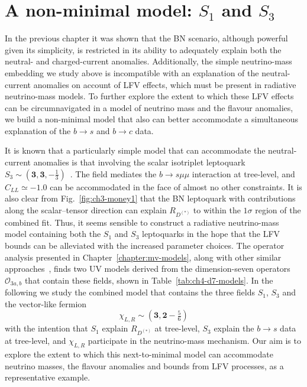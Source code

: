 \section{A non-minimal model: $S_{1}$ and $S_{3}$}
\label{sec:ch4-non-minimal}

In the previous chapter it was shown that the BN scenario, although powerful
given its simplicity, is restricted in its ability to adequately explain both
the neutral- and charged-current anomalies. Additionally, the simple
neutrino-mass embedding we study above is incompatible with an explanation of
the neutral-current anomalies on account of LFV effects, which must be present
in radiative neutrino-mass models. To further explore the extent to which these
LFV effects can be circumnavigated in a model of neutrino mass and the flavour
anomalies, we build a non-minimal model that also can better accommodate a
simultaneous explanation of the $b \to s$ and $b \to c$ data.

It is known that a particularly simple model that can accommodate the
neutral-current anomalies is that involving the scalar isotriplet leptoquark
$S_{3} \sim (\mathbf{3}, \mathbf{3}, -\tfrac{1}{3})$~\cite{Hiller:2014yaa,
  Kumar:2018era}. The field mediates the $b \to s \mu\mu$ interaction at
tree-level, and $C_{LL} \simeq -1.0$ can be accommodated in the face of almost
no other constraints. It is also clear from Fig.~\ref{fig:ch3-money1} that the
BN leptoquark with contributions along the scalar--tensor direction can explain
$R_{D^{(*)}}$ to within the $1\sigma$ region of the combined fit. Thus, it seems
sensible to construct a radiative neutrino-mass model containing both the
$S_{1}$ and $S_{3}$ leptoquarks in the hope that the LFV bounds can be
alleviated with the increased parameter choices. The operator analysis presented
in Chapter~\ref{chapter:mv-models}, along with other similar
approaches~\cite{Cai:2014kra, Bonnet:2012kz, Klein:2019iws}, finds two UV models
derived from the dimension-seven operators $\mathcal{O}_{3a,b}$ that contain
these fields, shown in Table~\ref{tab:ch4-d7-models}. In the following we study
the combined model that contains the three fields $S_{1}$, $S_{3}$ and the vector-like fermion
\begin{equation}
  \chi_{L,R} \sim (\mathbf{3}, \mathbf{2} - \tfrac{5}{6})
\end{equation}
with the intention that $S_{1}$ explain $R_{D^{(*)}}$ at tree-level, $S_{3}$
explain the $b \to s$ data at tree-level, and $\chi_{L,R}$ participate in the
neutrino-mass mechanism. Our aim is to explore the extent to which this
next-to-minimal model can accommodate neutrino masses, the flavour anomalies and
bounds from LFV processes, as a representative example.


